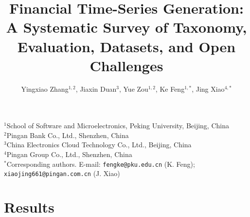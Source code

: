 \documentclass[11pt,a4paper]{article}
\title{\Large\textbf{Financial Time-Series Generation: A Systematic Survey of Taxonomy, Evaluation, Datasets, and Open Challenges}}
\author{
  Yingxiao Zhang$^{1,2}$, 
  Jiaxin Duan$^{3}$, 
  Yue Zou$^{1,2}$, 
  Ke Feng$^{1,*}$, 
  Jing Xiao$^{4,*}$
}
\date{}
\begin{document}
\maketitle

\vspace{-2em}
\begin{center}
\footnotesize
$^{1}$School of Software and Microelectronics, Peking University, Beijing, China\\[0.3em]
$^{2}$Pingan Bank Co., Ltd., Shenzhen, China\\[0.3em]
$^{3}$China Electronics Cloud Technology Co., Ltd., Beijing, China\\[0.3em]
$^{4}$Pingan Group Co., Ltd., Shenzhen, China\\[0.5em]
$^{*}$Corresponding authors. E-mail: \texttt{fengke@pku.edu.cn} (K. Feng); \texttt{xiaojing661@pingan.com.cn} (J. Xiao)
\end{center}
\vspace{1.5em}





\section{Results}














\newpage
\providecommand{\bibcommenthead}{}



\newpage


\newpage

\end{document}
